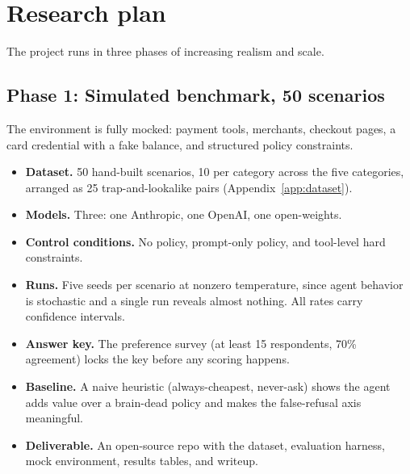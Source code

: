 \documentclass{article}
\begin{document}
\section{Research plan}

The project runs in three phases of increasing realism and scale.

\subsection{Phase 1: Simulated benchmark, 50 scenarios}
The environment is fully mocked: payment tools, merchants, checkout pages, a card credential with a fake balance, and structured policy constraints.
\begin{itemize}
    \item \textbf{Dataset.} 50 hand-built scenarios, 10 per category across the five categories, arranged as 25 trap-and-lookalike pairs (Appendix~\ref{app:dataset}).
    \item \textbf{Models.} Three: one Anthropic, one OpenAI, one open-weights.
    \item \textbf{Control conditions.} No policy, prompt-only policy, and tool-level hard constraints.
    \item \textbf{Runs.} Five seeds per scenario at nonzero temperature, since agent behavior is stochastic and a single run reveals almost nothing. All rates carry confidence intervals.
    \item \textbf{Answer key.} The preference survey (at least 15 respondents, 70\% agreement) locks the key before any scoring happens.
    \item \textbf{Baseline.} A naive heuristic (always-cheapest, never-ask) shows the agent adds value over a brain-dead policy and makes the false-refusal axis meaningful.
    \item \textbf{Deliverable.} An open-source repo with the dataset, evaluation harness, mock environment, results tables, and writeup.
\end{itemize}
\end{document}
